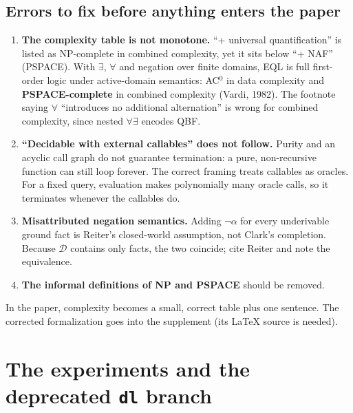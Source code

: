\documentclass[11pt]{article}
\begin{document}
\subsection{Errors to fix before anything enters the paper}
\begin{enumerate}[label=\textbf{5.\arabic*}]
  \item \textbf{The complexity table is not monotone.} ``+ universal quantification'' is listed as NP-complete in combined complexity, yet it sits below ``+ NAF'' (PSPACE). With $\exists$, $\forall$ and negation over finite domains, EQL is full first-order logic under active-domain semantics: AC$^0$ in data complexity and \textbf{PSPACE-complete} in combined complexity (Vardi, 1982). The footnote saying $\forall$ ``introduces no additional alternation'' is wrong for combined complexity, since nested $\forall\exists$ encodes QBF.
  \item \textbf{``Decidable with external callables'' does not follow.} Purity and an acyclic call graph do not guarantee termination: a pure, non-recursive function can still loop forever. The correct framing treats callables as oracles. For a fixed query, evaluation makes polynomially many oracle calls, so it terminates whenever the callables do.
  \item \textbf{Misattributed negation semantics.} Adding $\neg\alpha$ for every underivable ground fact is Reiter's closed-world assumption, not Clark's completion. Because $\mathcal{D}$ contains only facts, the two coincide; cite Reiter and note the equivalence.
  \item \textbf{The informal definitions of NP and PSPACE} should be removed.
\end{enumerate}

In the paper, complexity becomes a small, correct table plus one sentence. The corrected formalization goes into the supplement (its LaTeX source is needed).

\section{The experiments and the deprecated \texttt{dl} branch}
\end{document}
